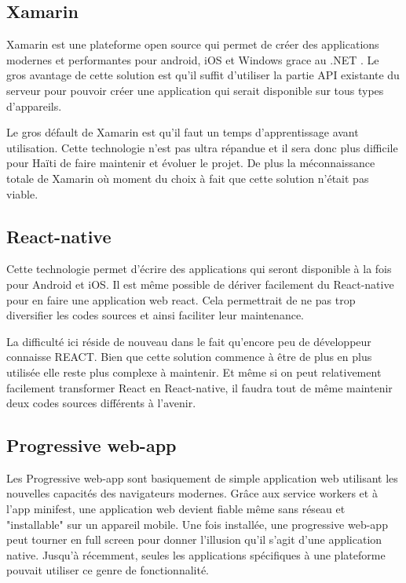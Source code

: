 \documentclass{EPL-master-thesis-covers-FR}
\begin{document}
			\subsection*{Xamarin}
				Xamarin est une plateforme open source qui permet de créer des applications modernes et performantes pour android, iOS et Windows grace au .NET \cite{ref:xamarin}. Le gros avantage de cette solution est qu'il suffit d'utiliser la partie API existante du serveur pour pouvoir créer une application qui serait disponible sur tous types d'appareils.
			
				Le gros défault de Xamarin est qu'il faut un temps d'apprentissage avant utilisation. Cette technologie n'est pas ultra répandue et il sera donc plus difficile pour Haïti de faire maintenir et évoluer le projet. De plus la méconnaissance totale de Xamarin où moment du choix à fait que cette solution n'était pas viable.
				
			\subsection*{React-native}
				Cette technologie permet d'écrire des applications qui seront disponible à la fois pour Android et iOS. Il est même possible de dériver facilement du React-native pour en faire une application web react. Cela permettrait de ne pas trop diversifier les codes sources et ainsi faciliter leur maintenance.
				
				La difficulté ici réside de nouveau dans le fait qu'encore peu de développeur connaisse REACT. Bien que cette solution commence à être de plus en plus utilisée elle reste plus complexe à maintenir. Et même si on peut relativement facilement transformer React en React-native, il faudra tout de même maintenir deux codes sources différents à l'avenir.
				
			\subsection*{Progressive web-app}
				Les Progressive web-app sont basiquement de simple application web utilisant les nouvelles capacités des navigateurs modernes. Grâce aux service workers et à l'app minifest, une application web devient fiable même sans réseau et "installable" sur un appareil mobile. Une fois installée, une progressive web-app peut tourner en full screen pour donner l'illusion qu'il s'agit d'une application native. Jusqu'à récemment, seules les applications spécifiques à une plateforme pouvait utiliser ce genre de fonctionnalité. 
				
\end{document}
